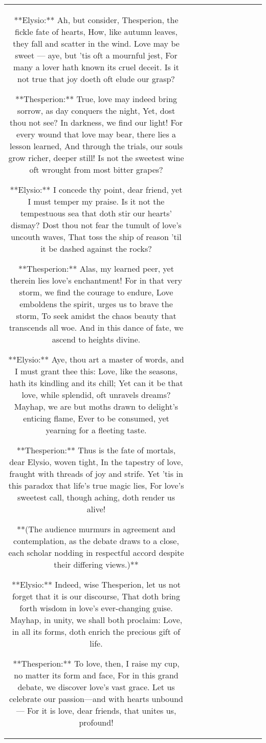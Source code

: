 \begin{table}[h!]
\begin{tabular}{|c|c|c|c|c|c|c|c|c|c|}
**Elysio:**  
Ah, but consider, Thesperion, the fickle fate of hearts,  
How, like autumn leaves, they fall and scatter in the wind.  
Love may be sweet — aye, but 'tis oft a mournful jest,  
For many a lover hath known its cruel deceit.  
Is it not true that joy doeth oft elude our grasp?  

**Thesperion:**  
True, love may indeed bring sorrow, as day conquers the night,  
Yet, dost thou not see? In darkness, we find our light!  
For every wound that love may bear, there lies a lesson learned,  
And through the trials, our souls grow richer, deeper still!  
Is not the sweetest wine oft wrought from most bitter grapes?  

**Elysio:**  
I concede thy point, dear friend, yet I must temper my praise.  
Is it not the tempestuous sea that doth stir our hearts’ dismay?  
Dost thou not fear the tumult of love’s uncouth waves,  
That toss the ship of reason 'til it be dashed against the rocks?  

**Thesperion:**  
Alas, my learned peer, yet therein lies love's enchantment!  
For in that very storm, we find the courage to endure,  
Love emboldens the spirit, urges us to brave the storm,  
To seek amidst the chaos beauty that transcends all woe.  
And in this dance of fate, we ascend to heights divine.  

**Elysio:**  
Aye, thou art a master of words, and I must grant thee this:  
Love, like the seasons, hath its kindling and its chill;  
Yet can it be that love, while splendid, oft unravels dreams?  
Mayhap, we are but moths drawn to delight’s enticing flame,  
Ever to be consumed, yet yearning for a fleeting taste.  

**Thesperion:**  
Thus is the fate of mortals, dear Elysio, woven tight,  
In the tapestry of love, fraught with threads of joy and strife.  
Yet ’tis in this paradox that life’s true magic lies,  
For love’s sweetest call, though aching, doth render us alive!  

**(The audience murmurs in agreement and contemplation, as the debate draws to a close, each scholar nodding in respectful accord despite their differing views.)** 

**Elysio:**  
Indeed, wise Thesperion, let us not forget that it is our discourse,  
That doth bring forth wisdom in love’s ever-changing guise.  
Mayhap, in unity, we shall both proclaim:  
Love, in all its forms, doth enrich the precious gift of life.  

**Thesperion:**  
To love, then, I raise my cup, no matter its form and face,  
For in this grand debate, we discover love’s vast grace.  
Let us celebrate our passion—and with hearts unbound—  
For it is love, dear friends, that unites us, profound!  


\end{tabular}
\end{table}
